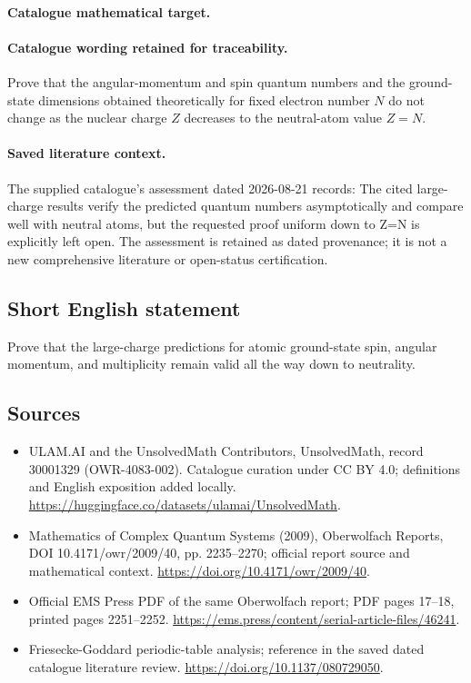 \documentclass[11pt]{article}
\begin{document}
\paragraph{Catalogue mathematical target.}
\paragraph{Catalogue wording retained for traceability.}
Prove that the angular-momentum and spin quantum numbers and the ground-state dimensions obtained theoretically for fixed electron number $N$ do not change as the nuclear charge $Z$ decreases to the neutral-atom value $Z=N$.

\paragraph{Saved literature context.} The supplied catalogue's assessment dated 2026-08-21 records: The cited large-charge results verify the predicted quantum numbers asymptotically and compare well with neutral atoms, but the requested proof uniform down to Z=N is explicitly left open. The assessment is retained as dated provenance; it is not a new comprehensive literature or open-status certification.
\subsection{Short English statement}
Prove that the large-charge predictions for atomic ground-state spin, angular momentum, and multiplicity remain valid all the way down to neutrality.
\subsection{Sources}
\begin{itemize}
\item[\hypertarget{source:30001329:1}{S1}] ULAM.AI and the UnsolvedMath Contributors, UnsolvedMath, record 30001329 (OWR-4083-002). Catalogue curation under CC BY 4.0; definitions and English exposition added locally.
\url{https://huggingface.co/datasets/ulamai/UnsolvedMath}.
\item[\hypertarget{source:30001329:2}{S2}] Mathematics of Complex Quantum Systems (2009), Oberwolfach Reports, DOI 10.4171/owr/2009/40, pp. 2235--2270; official report source and mathematical context.
\url{https://doi.org/10.4171/owr/2009/40}.
\item[\hypertarget{source:30001329:3}{S3}] Official EMS Press PDF of the same Oberwolfach report; PDF pages 17--18, printed pages 2251--2252.
\url{https://ems.press/content/serial-article-files/46241}.
\item[\hypertarget{source:30001329:4}{S4}] Friesecke-Goddard periodic-table analysis; reference in the saved dated catalogue literature review.
\url{https://doi.org/10.1137/080729050}.
\end{itemize}
\label{end:30001329}
\end{document}

